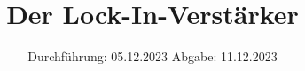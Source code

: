 

\subject{v303}
\title{Der Lock-In-Verstärker}
\date{%
  Durchführung: 05.12.2023
  \hspace{3em}
  Abgabe: 11.12.2023
}



\maketitle
\thispagestyle{empty}
\tableofcontents
\newpage






\printbibliography{}


